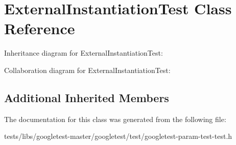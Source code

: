 \hypertarget{classExternalInstantiationTest}{}\section{External\+Instantiation\+Test Class Reference}
\label{classExternalInstantiationTest}


Inheritance diagram for External\+Instantiation\+Test\+:


Collaboration diagram for External\+Instantiation\+Test\+:
\subsection*{Additional Inherited Members}


The documentation for this class was generated from the following file\+:\begin{DoxyCompactItemize}
\item 
tests/libs/googletest-\/master/googletest/test/googletest-\/param-\/test-\/test.\+h\end{DoxyCompactItemize}
